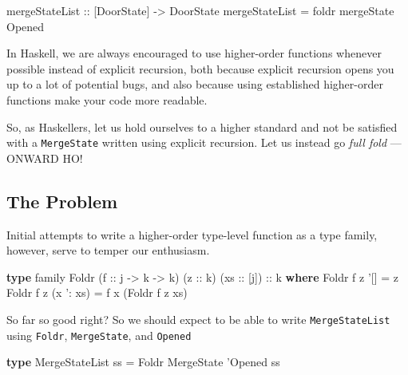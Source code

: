 \documentclass[]{article}
\newenvironment{Shaded}{}{}
\newcommand{\DataTypeTok}[1]{\textcolor[rgb]{0.56,0.13,0.00}{#1}}
\newcommand{\FunctionTok}[1]{\textcolor[rgb]{0.02,0.16,0.49}{#1}}
\newcommand{\KeywordTok}[1]{\textcolor[rgb]{0.00,0.44,0.13}{\textbf{#1}}}
\newcommand{\NormalTok}[1]{#1}
\newcommand{\OtherTok}[1]{\textcolor[rgb]{0.00,0.44,0.13}{#1}}
\begin{document}
\begin{Shaded}
\begin{Highlighting}[]
\OtherTok{mergeStateList ::}\NormalTok{ [}\DataTypeTok{DoorState}\NormalTok{] }\OtherTok{->} \DataTypeTok{DoorState}
\NormalTok{mergeStateList }\FunctionTok{=}\NormalTok{ foldr mergeState }\DataTypeTok{Opened}
\end{Highlighting}
\end{Shaded}

In Haskell, we are always encouraged to use higher-order functions whenever
possible instead of explicit recursion, both because explicit recursion opens
you up to a lot of potential bugs, and also because using established
higher-order functions make your code more readable.

So, as Haskellers, let us hold ourselves to a higher standard and not be
satisfied with a \texttt{MergeState} written using explicit recursion. Let us
instead go \emph{full fold} --- ONWARD HO!

\hypertarget{the-problem}{%
\subsection{The Problem}\label{the-problem}}

Initial attempts to write a higher-order type-level function as a type family,
however, serve to temper our enthusiasm.

\begin{Shaded}
\begin{Highlighting}[]
\KeywordTok{type}\NormalTok{ family }\DataTypeTok{Foldr}\NormalTok{ (}\OtherTok{f ::}\NormalTok{ j }\OtherTok{->}\NormalTok{ k }\OtherTok{->}\NormalTok{ k) (}\OtherTok{z ::}\NormalTok{ k) (}\OtherTok{xs ::}\NormalTok{ [j])}\OtherTok{ ::}\NormalTok{ k }\KeywordTok{where}
    \DataTypeTok{Foldr}\NormalTok{ f z '[]       }\FunctionTok{=}\NormalTok{ z}
    \DataTypeTok{Foldr}\NormalTok{ f z (x '}\FunctionTok{:}\NormalTok{ xs) }\FunctionTok{=}\NormalTok{ f x (}\DataTypeTok{Foldr}\NormalTok{ f z xs)}
\end{Highlighting}
\end{Shaded}

So far so good right? So we should expect to be able to write
\texttt{MergeStateList} using \texttt{Foldr}, \texttt{MergeState}, and
\texttt{\textquotesingle{}Opened}

\begin{Shaded}
\begin{Highlighting}[]
\KeywordTok{type} \DataTypeTok{MergeStateList}\NormalTok{ ss }\FunctionTok{=} \DataTypeTok{Foldr} \DataTypeTok{MergeState}\NormalTok{ '}\DataTypeTok{Opened}\NormalTok{ ss}
\end{Highlighting}
\end{Shaded}
\end{document}

